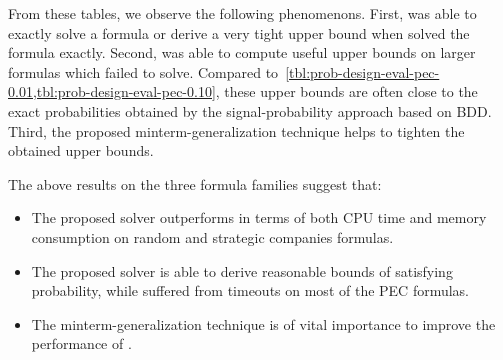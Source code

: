 From these tables, we observe the following phenomenons.
First, \ressat was able to exactly solve a formula or derive a very tight upper bound
when \dcssat solved the formula exactly.
Second, \ressat was able to compute useful upper bounds on larger formulas which \dcssat failed to solve.
Compared to~\cref{tbl:prob-design-eval-pec-0.01,tbl:prob-design-eval-pec-0.10},
these upper bounds are often close to the exact probabilities obtained by the signal-probability approach based on BDD.
Third, the proposed minterm-generalization technique helps to tighten the obtained upper bounds.

The above results on the three formula families suggest that:
\begin{itemize}
    \item The proposed solver \ressat outperforms \dcssat in terms of both CPU time and memory consumption on random and strategic companies formulas.
    \item The proposed solver \ressat is able to derive reasonable bounds of satisfying probability,
          while \dcssat suffered from timeouts on most of the PEC formulas.
    \item The minterm-generalization technique is of vital importance to improve the performance of \ressat.
\end{itemize}